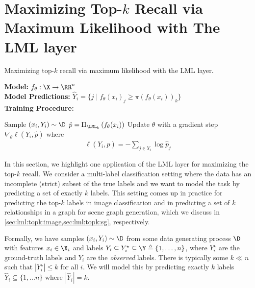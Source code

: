 \section{Maximizing Top-$k$ Recall via
  Maximum Likelihood with The LML layer}
\label{sec:lml:topk}

\begin{algorithm}[t]
  \caption{Maximizing top-$k$ recall via
  maximum likelihood with the LML layer.}
\label{alg:topk}
\textbf{Model:} $f_\theta: \X\rightarrow\RR^n $ \\
\textbf{Model Predictions:}
  $\hat Y_i = \{j \mid f_{\theta}(x_i)_j \geq
  \pi\left(f_{\theta}(x_i)\right)_k\}$ \\
\textbf{Training Procedure:}
\begin{algorithmic}[1]
    \State Sample $(x_i,Y_i)\sim \D$
    \State $\hat p = \Pi_{\LML_k}\left(f_\theta(x_i)\right)$
    \State Update $\theta$ with a gradient step
      $\nabla_\theta \ell(Y_i, \hat p)$ where
      \begin{equation*}
        \begin{split}
          \ell(Y_i, \hat p) = -\sum_{j\in Y_i} \log \hat p_j
        \end{split}
      \end{equation*}
  \EndWhile
\end{algorithmic}
\end{algorithm}

In this section, we highlight one application of the
LML layer for maximizing the top-$k$ recall.
We consider a multi-label classification setting
where the data has an incomplete (strict) subset of
the true labels and we want to model the task by
predicting a set of exactly $k$ labels.
This setting comes up in practice for
predicting the top-$k$ labels in image classification
and in predicting a set of $k$ relationships in
a graph for scene graph generation,
which we discuss in
\cref{sec:lml:topk:image,sec:lml:topk:sg},
respectively.

Formally, we have samples $(x_i, Y_i)\sim \D$ from some data
generating process $\D$ with features $x_i\in\X_i $ and labels
$Y_i\subseteq Y^\star_i\subseteq\Y\triangleq\{1,\ldots,n\}$,
where $Y^\star_i$ are the
ground-truth labels and $Y_i$ are the \emph{observed} labels.
There is typically some $k\ll n$ such
that $|Y_i^\star|\leq k$ for all $i$.
We will model this by predicting exactly $k$ labels
$\hat Y_i \subseteq \{1, \ldots n\}$ where $|\hat Y_i|=k$.

